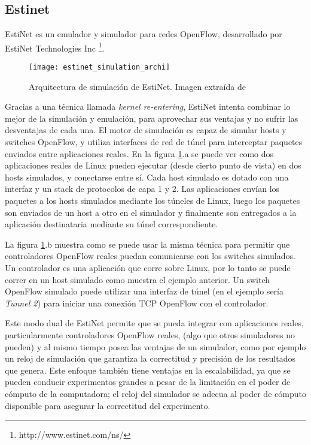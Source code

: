 \subsection{Estinet}
EstiNet \cite{estinet} es un emulador y simulador para redes OpenFlow, desarrollado por EstiNet Technologies Inc \footnote{http://www.estinet.com/ns/}.

\begin{figure}[H]
	\caption{Arquitectura de simulación de EstiNet. Imagen extraída de \cite{estinet}}
	\texttt{[image: estinet\_simulation\_archi]}
	\centering
	\label{fig:estinet_simulation_archi}
\end{figure}

Gracias a una técnica llamada \textit{kernel re-entering}, EstiNet intenta combinar lo mejor de la simulación y emulación, para aprovechar sus ventajas y no sufrir las desventajas de cada una. El motor de simulación es capaz de simular hosts y switches OpenFlow, y utiliza interfaces de red de túnel para interceptar paquetes enviados entre aplicaciones reales. En la figura \ref{fig:estinet_simulation_archi}.a se puede ver como dos aplicaciones reales de Linux pueden ejecutar (desde cierto punto de vista) en dos hosts simulados, y conectarse entre sí. Cada host simulado es dotado con una interfaz y un stack de protocolos de capa 1 y 2. Las aplicaciones envían los paquetes a los hosts simulados mediante los túneles de Linux, luego los paquetes son enviados de un host a otro en el simulador y finalmente son entregados a la aplicación destinataria mediante su túnel correspondiente.

La figura \ref{fig:estinet_simulation_archi}.b muestra como se puede usar la misma técnica para permitir que controladores OpenFlow reales puedan comunicarse con los switches simulados. Un controlador es una aplicación que corre sobre Linux, por lo tanto se puede correr en un host simulado como muestra el ejemplo anterior. Un switch OpenFlow simulado puede utilizar una interfaz de túnel (en el ejemplo sería \textit{Tunnel 2}) para iniciar una conexión TCP OpenFlow con el controlador.

Este modo dual de EstiNet permite que se pueda integrar con aplicaciones reales, particularmente controladores OpenFlow reales, (algo que otros simuladores no pueden) y al mismo tiempo posea las ventajas de un simulador, como por ejemplo un reloj de simulación que garantiza la correctitud y precisión de los resultados que genera. Este enfoque también tiene ventajas en la escalabilidad, ya que se pueden conducir experimentos grandes a pesar de la limitación en el poder de cómputo de la computadora; el reloj del simulador se adecua al poder de cómputo disponible para asegurar la correctitud del experimento.

